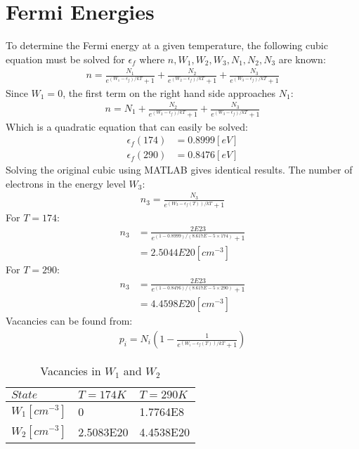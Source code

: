 \documentclass{article}
\numberwithin{equation}{section}
\begin{document}
\large
\section*{Fermi Energies}

To determine the Fermi energy at a given temperature, the following cubic equation must be solved for $\epsilon_f$ where $n,W_1,W_2,W_3,N_1,N_2,N_3$ are known:
\begin{align*}
n=\frac{N_1}{e^{(W_1-\epsilon_f)/kT}+1}+\frac{N_2}{e^{(W_2-\epsilon_f)/kT}+1}+\frac{N_3}{e^{(W_3-\epsilon_f)/kT}+1}
\end{align*}
Since $W_1=0$, the first term on the right hand side approaches $N_1$:
\begin{align*}
n=N_1+\frac{N_2}{e^{(W_2-\epsilon_f)/kT}+1}+\frac{N_3}{e^{(W_3-\epsilon_f)/kT}+1}
\end{align*}
Which is a quadratic equation that can easily be solved:
\begin{align*}
\epsilon_f(174)&=0.8999 [eV]\\
\epsilon_f(290)&=0.8476 [eV]
\end{align*}
Solving the original cubic using MATLAB gives identical results. The number of electrons in the energy level $W_3$:
\begin{align*}
n_3=\frac{N_3}{e^{(W_3-\epsilon_f(T))/kT}+1}
\end{align*}
For $T=174$:
\begin{align*}
n_3&=\frac{2E23}{e^{(1-0.8999)/(8.617E-5\times174)}+1}\\
   &=2.5044E20 [cm^{-3}]
\end{align*}
For $T=290$:
\begin{align*}
n_3&=\frac{2E23}{e^{(1-0.8476)/(8.617E-5\times290)}+1}\\
   &=4.4598E20 [cm^{-3}]
\end{align*}
Vacancies can be found from:
\begin{align*}
p_i=N_i(1-\frac{1}{e^{(W_i-\epsilon_f(T))/kT}+1})
\end{align*}
\begin{table} [!h]
 \begin{center}
  \begin{tabular}{| l |l |l|}
  \hline
  $State$ & $T=174K$& $T=290K$\\
  \hline
   $W_1 [cm^{-3}]$& 0 & 1.7764E8\\ \hline
   $W_2 [cm^{-3}]$& 2.5083E20 &4.4538E20\\ \hline
  \end{tabular}
\caption{Vacancies in $W_1$ and $W_2$}
 \end{center}
\end{table}
\end{document}
